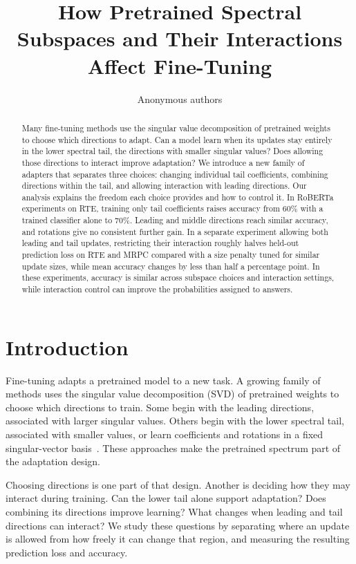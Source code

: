 \documentclass{article}
\title{How Pretrained Spectral Subspaces and Their Interactions Affect Fine-Tuning}
\author{Anonymous authors}
\begin{document}
\maketitle

\begin{abstract}
Many fine-tuning methods use the singular value decomposition of pretrained weights to choose which directions to adapt. Can a model learn when its updates stay entirely in the lower spectral tail, the directions with smaller singular values? Does allowing those directions to interact improve adaptation? We introduce a new family of adapters that separates three choices: changing individual tail coefficients, combining directions within the tail, and allowing interaction with leading directions. Our analysis explains the freedom each choice provides and how to control it. In RoBERTa experiments on RTE, training only tail coefficients raises accuracy from 60\% with a trained classifier alone to 70\%. Leading and middle directions reach similar accuracy, and rotations give no consistent further gain. In a separate experiment allowing both leading and tail updates, restricting their interaction roughly halves held-out prediction loss on RTE and MRPC compared with a size penalty tuned for similar update sizes, while mean accuracy changes by less than half a percentage point. In these experiments, accuracy is similar across subspace choices and interaction settings, while interaction control can improve the probabilities assigned to answers.

\end{abstract}

\section{Introduction}
\label{sec:intro}

Fine-tuning adapts a pretrained model to a new task. A growing family of methods uses the singular value decomposition (SVD) of pretrained weights to choose which directions to train. Some begin with the leading directions, associated with larger singular values. Others begin with the lower spectral tail, associated with smaller values, or learn coefficients and rotations in a fixed singular-vector basis~\citep{meng2024pissa,wang2025milora,han2023svdiff,lingam2024svft,zhang2024spectral,wu2026psoft}. These approaches make the pretrained spectrum part of the adaptation design.

Choosing directions is one part of that design. Another is deciding how they may interact during training. Can the lower tail alone support adaptation? Does combining its directions improve learning? What changes when leading and tail directions can interact? We study these questions by separating where an update is allowed from how freely it can change that region, and measuring the resulting prediction loss and accuracy.
\end{document}
